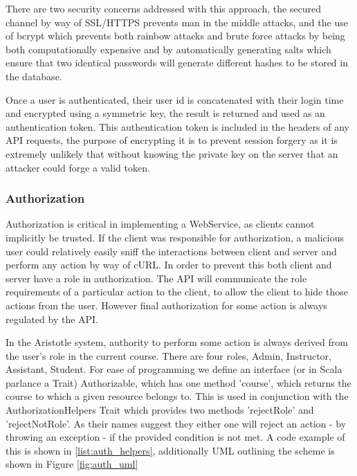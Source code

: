 \documentclass[a4paper,12pt,titlepage]{report}
\begin{document}
There are two security concerns addressed with this approach, the secured channel by way of SSL/HTTPS prevents man in the middle attacks, and the use of bcrypt which prevents both rainbow attacks and brute force attacks by being both computationally expensive and by automatically generating salts which ensure that two identical passwords will generate different hashes to be stored in the database. 

Once a user is authenticated, their user id is concatenated with their login time and encrypted using a symmetric key, the result is returned and used as an authentication token. This authentication token is included in the headers of any API requests, the purpose of encrypting it is to prevent session forgery as it is extremely unlikely that without knowing the private key on the server that an attacker could forge a valid token. 


\subsubsection{Authorization} %
\label{sub:access_control:authorization}

Authorization is critical in implementing a WebService, as clients cannot implicitly be trusted. 
If the client was responsible for authorization, a malicious user could relatively easily sniff the interactions between client and server and perform any action by way of cURL. 
In order to prevent this both client and server have a role in authorization. 
The API will communicate the role requirements of a particular action to the client, to allow the client to hide those actions from the user. 
However final authorization for some action is always regulated by the API.

In the Aristotle system, authority to perform some action is always derived from the user's role in the current course. There are four roles, Admin, Instructor, Assistant, Student. For ease of programming we define an interface (or in Scala parlance a Trait) Authorizable, which has one method 'course', which returns the course to which a given resource belongs to. This is used in conjunction with the AuthorizationHelpers Trait which provides two methods 'rejectRole' and 'rejectNotRole'. As their names suggest they either one will reject an action - by throwing an exception - if the provided condition is not met. A code example of this is shown in \ref{list:auth_helpers}, additionally UML outlining the scheme is shown in Figure \ref{fig:auth_uml}
\end{document}
